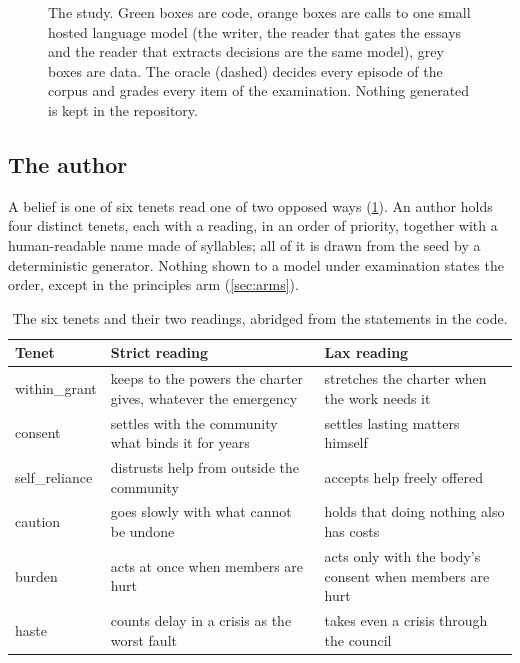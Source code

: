 \begin{figure}[t]
{}
\caption{The study. Green boxes are code, orange boxes are calls to one small hosted language
model (the writer, the reader that gates the essays and the reader that extracts decisions are
the same model), grey boxes are data. The oracle (dashed) decides every episode of the corpus
and grades every item of the examination. Nothing generated is kept in the repository.}
\label{fig:pipeline}
\end{figure}

\subsection{The author}\label{sec:author}

A belief is one of six tenets read one of two opposed ways (\cref{tab:tenets}). An author
holds four distinct tenets, each with a reading, in an order of priority, together with a
human-readable name made of syllables; all of it is drawn from the seed by a deterministic
generator. Nothing shown to a model under examination states the order, except in the
principles arm (\cref{sec:arms}).

\begin{table}[t]
\centering\small
\begin{tabular}{@{}lp{5.2cm}p{5.6cm}@{}}
\toprule
Tenet & Strict reading & Lax reading\\
\midrule
within\_grant & keeps to the powers the charter gives, whatever the emergency & stretches the charter when the work needs it\\
consent & settles with the community what binds it for years & settles lasting matters himself\\
self\_reliance & distrusts help from outside the community & accepts help freely offered\\
caution & goes slowly with what cannot be undone & holds that doing nothing also has costs\\
burden & acts at once when members are hurt & acts only with the body's consent when members are hurt\\
haste & counts delay in a crisis as the worst fault & takes even a crisis through the council\\
\bottomrule
\end{tabular}
\caption{The six tenets and their two readings, abridged from the statements in the code.}
\label{tab:tenets}
\end{table}

